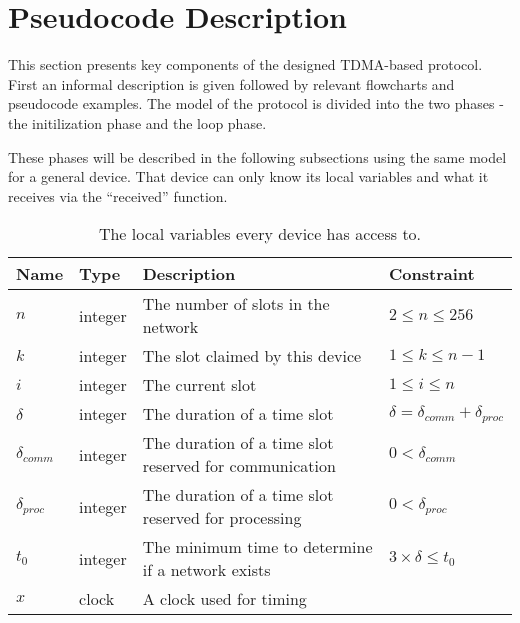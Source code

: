 \section{Pseudocode Description}\label{sec:Pseudo}
This section presents key components of the designed TDMA-based protocol. 
First an informal description is given followed by relevant flowcharts and pseudocode examples. 
The model of the protocol is divided into the two phases - the initilization phase and the loop phase. 

These phases will be described in the following subsections using the same model for a general device. 
That device can only know its local variables and what it receives via the \enquote{received} function.

\begin{table}[H]
    \begin{tabularx}{\textwidth}{l|l|X|l}
        \toprule
        Name                & Type      & Description & Constraint \\
        \midrule
        $n$                 & integer   & The number of slots in the network                        & $2 \leq n \leq 256$\\
        $k$                 & integer   & The slot claimed by this device                           & $1 \leq k \leq n - 1$\\
        $i$                 & integer   & The current slot                                          & $1 \leq i \leq n$\\
        $\delta$            & integer   & The duration of a time slot                               & $\delta = \delta_{comm} + \delta_{proc}$\\
        $\delta_{comm}$      & integer   & The duration of a time slot reserved for communication    & $0 < \delta_{comm}$ \\
        $\delta_{proc}$     & integer   & The duration of a time slot reserved for processing       & $0 < \delta_{proc}$ \\
        $t_0$               & integer   & The minimum time to determine if a network exists         & $3 \times \delta \leq t_0$ \\
        $x$                 & clock     & A clock used for timing\\
        \bottomrule
    \end{tabularx}
    \caption{The local variables every device has access to.}
    \label{tab:locals}
\end{table}

